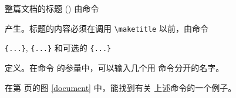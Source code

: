 整篇文档的标题 () 由命令
\begin{lscommand}
\end{lscommand}
\noindent 产生。标题的内容必须在调用 \verb|\maketitle| 以前，由命令
\begin{lscommand}
\verb|{...}|, \verb|{...}| 和可选的 \verb|{...}|
\end{lscommand}
\noindent
定义。在命令  的参量中，可以输入几个用  命令分开的名字。


在第 \pageref{document} 页的图 \ref{document} 中，能找到有关
上述命令的一个例子。

